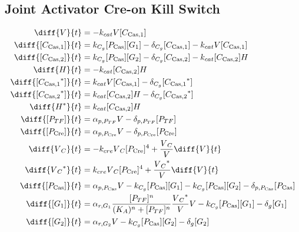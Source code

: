 \subsection{Joint Activator Cre-on Kill Switch}
\label{s:Joint_Activator_Cre_on_Kill_Switch}

\begin{align}
\diff{\vectorGen{}}{t} & = - \casCutRate{{}}\vectorGen{}\conc{\cplx{\cas}{1}}\\
\diff{\conc{\cplx{\cas}{1}}}{t} & =  \gRnaBind{}\conc{\proSp{\cas{}}}\conc{\gRna{1}} - \casCompDegradeRate{}\conc{\cplx{\cas}{1}} - \casCutRate{{}}\vectorGen{}\conc{\cplx{\cas}{1}}\\
\diff{\conc{\cplx{\cas}{2}}}{t} & =  \gRnaBind{}\conc{\proSp{\cas{}}}\conc{\gRna{2}} - \casCompDegradeRate{}\conc{\cplx{\cas}{2}} - \casCutRate{{}}\conc{\cplx{\cas}{2}}\hostGen{}\\
\diff{\hostGen{}}{t} & = - \casCutRate{{}}\conc{\cplx{\cas}{2}}\hostGen{}\\
\diff{\conc{\bound{\cplx{\cas}{1}}}}{t} & =  \casCutRate{{}}\vectorGen{}\conc{\cplx{\cas}{1}} - \casCompDegradeRate{}\conc{\bound{\cplx{\cas}{1}}}\\
\diff{\conc{\bound{\cplx{\cas}{2}}}}{t} & =  \casCutRate{{}}\conc{\cplx{\cas}{2}}\hostGen{} - \casCompDegradeRate{}\conc{\bound{\cplx{\cas}{2}}}\\
\diff{\edited{\hostGen{}}}{t} & =  \casCutRate{{}}\conc{\cplx{\cas}{2}}\hostGen{}\\
\diff{\conc{\proSp{TF}}}{t} & =  \txtlRate{\proSp{TF}}\vectorGen{} - \proDegradeRate{\proSp{TF}}\conc{\proSp{TF}}\\
\diff{\conc{\proSp{\cre{}}}}{t} & =  \txtlRate{\proSp{\cre{}}}\vectorGen{} - \proDegradeRate{\proSp{\cre{}}}\conc{\proSp{\cre{}}}\\
\diff{\vectorGen{}_C}{t} & = - \creCutRate{} \vectorGen{}_C \conc{\proSp{\cre{}}}^4 + \frac{\vectorGen{}_C}{\vectorGen{}} \diff{\vectorGen{}}{t}\\
\diff{\edited{\vectorGen{}_C}}{t} & =  \creCutRate{} \vectorGen{}_C \conc{\proSp{\cre{}}}^4 + \frac{\edited{\vectorGen{}_C}}{\vectorGen{}} \diff{\vectorGen{}}{t}\\
\diff{\conc{\proSp{\cas{}}}}{t} & =  \txtlRate{\proSp{\cas{}}}\vectorGen{} - \gRnaBind{}\conc{\proSp{\cas{}}}\conc{\gRna{1}} - \gRnaBind{}\conc{\proSp{\cas{}}}\conc{\gRna{2}} - \proDegradeRate{\proSp{\cas{}}}\conc{\proSp{\cas{}}}\\
\diff{\conc{\gRna{1}}}{t} & =  \txRate{\gRna{1}}\frac{\conc{\proSp{TF}}^n}{(K_A)^n + \conc{\proSp{TF}}^n}\frac{\edited{\vectorGen{}_C}}{\vectorGen{}}\vectorGen{} - \gRnaBind{}\conc{\proSp{\cas{}}}\conc{\gRna{1}} - \rnaDegradeRate{}\conc{\gRna{1}}\\
\diff{\conc{\gRna{2}}}{t} & =  \txRate{\gRna{2}}\vectorGen{} - \gRnaBind{}\conc{\proSp{\cas{}}}\conc{\gRna{2}} - \rnaDegradeRate{}\conc{\gRna{2}}
\end{align}

